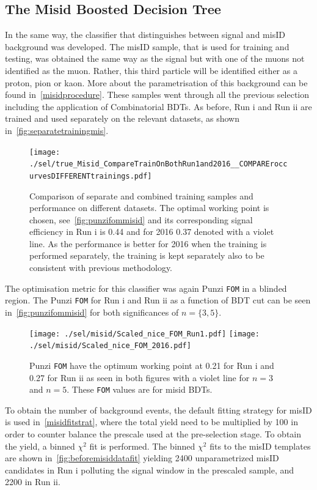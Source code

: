 \subsection{The Misid Boosted Decision Tree}
\label{misidbdt}
In the same way, the classifier that distinguishes between signal and misID background was developed. The misID sample, that is used for training and testing, was obtained the same way as the signal but with one of the muons not identified as the muon. Rather, this third particle will be identified either as a proton, pion or kaon. More about the parametrisation of this background can be found in~\autoref{misidprocedure}. These samples went through all the previous selection including the application of Combinatorial BDTs. As before, Run \Rn{1} and Run \Rn{2} are trained and used separately on the relevant datasets, as shown in~\autoref{fig:separatetrainingmis}. 


\begin{figure}[ht]
\centering
\texttt{[image: ./sel/true\_Misid\_CompareTrainOnBothRun1and2016\_\_COMPAREroccurvesDIFFERENTtrainings.pdf]}
	\caption{Comparison of separate and combined training samples and performance on different datasets. The optimal working point is chosen, see~\autoref{fig:punzifommisid} and its corresponding signal efficiency in Run \Rn{1} is 0.44 and for 2016 0.37 denoted with a violet line. As the performance is better for 2016 when the training is performed separately, the training is kept separately also to be consistent with previous methodology.}
\label{fig:separatetrainingmis}
\end{figure}

The optimisation metric for this classifier was again Punzi \texttt{FOM} in a blinded region. The Punzi \texttt{FOM} for Run \Rn{1} and Run \Rn{2} as a function of BDT cut can be seen in~\autoref{fig:punzifommisid} for both significances of $n=\{3,5\}$.

\begin{figure}[ht]
\centering
	\texttt{[image: ./sel/misid/Scaled\_nice\_FOM\_Run1.pdf]}%
	\texttt{[image: ./sel/misid/Scaled\_nice\_FOM\_2016.pdf]}%
	\caption{ Punzi \texttt{FOM} have the optimum working point at 0.21 for Run \Rn{1} and 0.27 for Run \Rn{2} as seen in both figures with a violet line for $n=3$ and $n=5$. These \texttt{FOM} values are for misid BDTs.}
\label{fig:punzifommisid}
\end{figure}


To obtain the number of background events, the default fitting strategy for misID is used in~\autoref{misidfitstrat}, where the total yield need to be multiplied by 100 in order to counter balance the prescale used at the pre-selection stage. To obtain the yield, a binned $\chi^{2}$ fit is performed. The binned $\chi^{2}$ fits to the misID templates are shown in~\autoref{fig:beforemisiddatafit} yielding 2400 unparametrized misID candidates in Run \Rn{1} polluting the signal window in the prescaled sample, and 2200 in Run \Rn{2}. 

